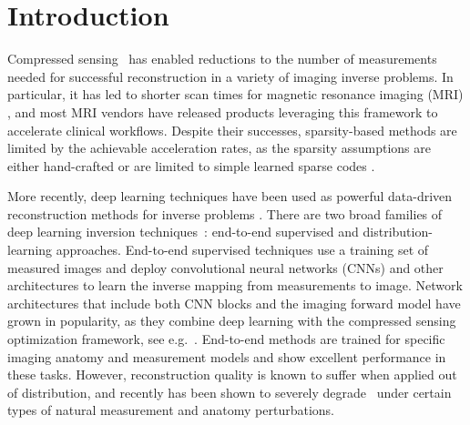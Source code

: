 \section{Introduction}

Compressed sensing~\cite{donoho2006compressed,candes2008restricted}
has enabled reductions to the number of measurements needed for
successful reconstruction in a variety of imaging inverse problems. In
particular, it has led to shorter scan times for magnetic resonance
imaging (MRI) \cite{lustig2007sparse,vasanawala2010csmri}, and most
MRI vendors have released products leveraging this framework to
accelerate clinical workflows.  Despite their successes,
sparsity-based methods are limited by the achievable acceleration
rates, as the sparsity assumptions are either hand-crafted or are
limited to simple learned sparse codes
\cite{bresler2011dictionarylearning,ravishankar2017datadriven}. 

More recently, deep learning techniques have been used as powerful
data-driven reconstruction methods for inverse problems
\cite{unser2017deepinverse,ongie2020deep}. There are two broad
families of deep learning inversion techniques~\cite{ongie2020deep}:
end-to-end supervised and distribution-learning approaches.
End-to-end supervised techniques use a training set of measured images
and deploy convolutional neural networks (CNNs) and other
architectures to learn the inverse mapping from measurements to image.
Network architectures that include both CNN blocks and the imaging
forward model have grown in popularity, as they combine deep learning
with the compressed sensing optimization framework, see
e.g.~\cite{hammernik2018learning,aggarwal2018modl,mardani2018deep}.
End-to-end methods are trained for specific imaging anatomy and
measurement models and show excellent performance in these tasks.
However, reconstruction quality is known to suffer when applied out of
distribution, and recently has been shown to severely
degrade~\cite{antun2020instabilities,darestani2021measuring} under
certain types of natural measurement and anatomy perturbations. 

